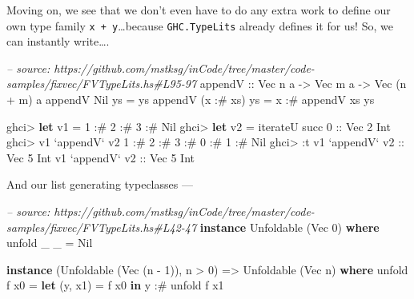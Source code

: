 \documentclass[]{article}
\newenvironment{Shaded}{}{}
\newcommand{\KeywordTok}[1]{\textcolor[rgb]{0.00,0.44,0.13}{\textbf{{#1}}}}
\newcommand{\DataTypeTok}[1]{\textcolor[rgb]{0.56,0.13,0.00}{{#1}}}
\newcommand{\DecValTok}[1]{\textcolor[rgb]{0.25,0.63,0.44}{{#1}}}
\newcommand{\CommentTok}[1]{\textcolor[rgb]{0.38,0.63,0.69}{\textit{{#1}}}}
\newcommand{\OtherTok}[1]{\textcolor[rgb]{0.00,0.44,0.13}{{#1}}}
\newcommand{\FunctionTok}[1]{\textcolor[rgb]{0.02,0.16,0.49}{{#1}}}
\newcommand{\NormalTok}[1]{{#1}}
\begin{document}
Moving on, we see that we don't even have to do any extra work to define our own
type family \texttt{x\ +\ y}\ldots{}because \texttt{GHC.TypeLits} already
defines it for us! So, we can instantly write\ldots{}.

\begin{Shaded}
\begin{Highlighting}[]
\CommentTok{-- source: https://github.com/mstksg/inCode/tree/master/code-samples/fixvec/FVTypeLits.hs#L95-97}
\OtherTok{appendV ::} \DataTypeTok{Vec} \NormalTok{n a }\OtherTok{->} \DataTypeTok{Vec} \NormalTok{m a }\OtherTok{->} \DataTypeTok{Vec} \NormalTok{(n }\FunctionTok{+} \NormalTok{m) a}
\NormalTok{appendV }\DataTypeTok{Nil}       \NormalTok{ys }\FunctionTok{=} \NormalTok{ys}
\NormalTok{appendV (x }\FunctionTok{:#} \NormalTok{xs) ys }\FunctionTok{=} \NormalTok{x }\FunctionTok{:#} \NormalTok{appendV xs ys}
\end{Highlighting}
\end{Shaded}

\begin{Shaded}
\begin{Highlighting}[]
\NormalTok{ghci}\FunctionTok{>} \KeywordTok{let} \NormalTok{v1 }\FunctionTok{=} \DecValTok{1} \FunctionTok{:#} \DecValTok{2} \FunctionTok{:#} \DecValTok{3} \FunctionTok{:#} \DataTypeTok{Nil}
\NormalTok{ghci}\FunctionTok{>} \KeywordTok{let} \NormalTok{v2 }\FunctionTok{=} \NormalTok{iterateU succ }\DecValTok{0}\OtherTok{ ::} \DataTypeTok{Vec} \DecValTok{2} \DataTypeTok{Int}
\NormalTok{ghci}\FunctionTok{>} \NormalTok{v1 }\OtherTok{`appendV`} \NormalTok{v2}
\DecValTok{1} \FunctionTok{:#} \DecValTok{2} \FunctionTok{:#} \DecValTok{3} \FunctionTok{:#} \DecValTok{0} \FunctionTok{:#} \DecValTok{1} \FunctionTok{:#} \DataTypeTok{Nil}
\NormalTok{ghci}\FunctionTok{>} \FunctionTok{:}\NormalTok{t v1 }\OtherTok{`appendV` v2 ::} \DataTypeTok{Vec} \DecValTok{5} \DataTypeTok{Int}
\NormalTok{v1 }\OtherTok{`appendV` v2 ::} \DataTypeTok{Vec} \DecValTok{5} \DataTypeTok{Int}
\end{Highlighting}
\end{Shaded}

And our list generating typeclasses ---

\begin{Shaded}
\begin{Highlighting}[]
\CommentTok{-- source: https://github.com/mstksg/inCode/tree/master/code-samples/fixvec/FVTypeLits.hs#L42-47}
\KeywordTok{instance} \DataTypeTok{Unfoldable} \NormalTok{(}\DataTypeTok{Vec} \DecValTok{0}\NormalTok{) }\KeywordTok{where}
    \NormalTok{unfold _ _ }\FunctionTok{=} \DataTypeTok{Nil}

\KeywordTok{instance} \NormalTok{(}\DataTypeTok{Unfoldable} \NormalTok{(}\DataTypeTok{Vec} \NormalTok{(n }\FunctionTok{-} \DecValTok{1}\NormalTok{)), n }\FunctionTok{>} \DecValTok{0}\NormalTok{) }\OtherTok{=>} \DataTypeTok{Unfoldable} \NormalTok{(}\DataTypeTok{Vec} \NormalTok{n) }\KeywordTok{where}
    \NormalTok{unfold f x0 }\FunctionTok{=} \KeywordTok{let} \NormalTok{(y, x1) }\FunctionTok{=} \NormalTok{f x0}
                  \KeywordTok{in}  \NormalTok{y }\FunctionTok{:#} \NormalTok{unfold f x1}
\end{Highlighting}
\end{Shaded}
\end{document}
